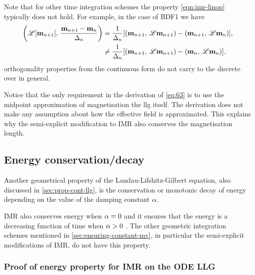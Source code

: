 Note that for other time integration schemes the property \cref{eqn:imr-linop} typically does not hold.
For example, in the case of BDF1 we have
\begin{equation}
  \begin{aligned}
    \left(\mathscr{L} {\left[ \mathbf{m}_{n+1} \right]},\,  \frac{\mathbf{m}_{n+1} - \mathbf{m}_n}{\Delta_{n}}  \right)
    &= \frac{1}{\Delta_{n}} {\left[  \left(\mathbf{m}_{n+1},\, \mathscr{L} \mathbf{m}_{n+1} \right) 
      - \left(\mathbf{m}_{n+1},\, \mathscr{L} \mathbf{m}_n \right)  \right]}, \\
    &\neq \frac{1}{\Delta_{n}} {\left[  \left(\mathbf{m}_{n+1},\, \mathscr{L} \mathbf{m}_{n+1} \right)
      - \left(\mathbf{m}_n,\, \mathscr{L} \mathbf{m}_n \right)  \right]},
  \end{aligned}
\end{equation}
\ie orthogonality properties from the continuous form do not carry to the discrete over in general.

Notice that the only requirement in the derivation of \cref{eq:63} is to use the midpoint approximation of magnetisation the llg itself.
The derivation does not make any assumption about how the effective field is approximated.
This explains why the semi-explicit modification to IMR also conserves the magnetisation length. 


\subsection{Energy conservation/decay}
\label{sec:energy-cons}

Another geometrical property of the Landau-Lifshitz-Gilbert equation, also discussed in \cref{sec:prop-cont-llg}, is the conservation or monotonic decay of energy depending on the value of the damping constant $\alpha$.

IMR also conserves energy when $\alpha = 0$ and it ensures that the energy is a decreasing function of time when $\alpha > 0$ \cite{DAquino2005}.
The other geometric integration schemes mentioned in \cref{sec:ensuring-constant-mv}, in particular the semi-explicit modifications of IMR, do not have this property.


\subsubsection{Proof of energy property for IMR on the ODE LLG}
\label{sec:proof-energy-prop}

\newcommand{\happerror}{\mathcal{E}_\text{ap}}

